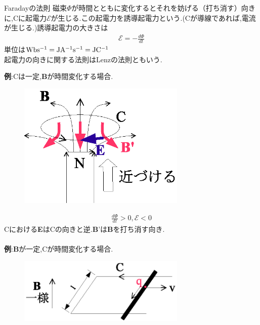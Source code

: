 \documentclass[../main]{subfiles}
\begin{document}
\begin{itembox}[c]{Faradayの法則}
磁束$\Phi$が時間とともに変化するとそれを妨げる（打ち消す）向きに,Cに起電力$\mathcal{E}$が生じる.この起電力を誘導起電力という.(Cが導線であれば,電流が生じる.)誘導起電力の大きさは
\begin{eqnarray}
\mathcal{E}=-\frac{d \Phi}{dt}
\end{eqnarray}
単位は${\rm Wbs^{-1}=JA^{-1}s^{-1}=JC^{-1}}$ \\
起電力の向きに関する法則はLenzの法則ともいう.
\end{itembox}
{\bf 例}:Cは一定,{\bf B}が時間変化する場合. \\

\begin{figure}[htbp]
 \begin{center}
  \includegraphics[width=80mm]{11.1.eps}
 \end{center}
 \caption{}
 \label{fig:one}
\end{figure}

\begin{eqnarray*}
\frac{d \Phi}{dt} > 0,\mathcal{E}<0
\end{eqnarray*}
Cにおける{\bf E}はCの向きと逆.{\bf B}'は{\bf B}を打ち消す向き. \\
\\
{\bf 例}:{\bf B}が一定,Cが時間変化する場合. \\

\begin{figure}[htbp]
 \begin{center}
  \includegraphics[width=80mm]{11.2.eps}
 \end{center}
 \caption{}
 \label{fig:one}
\end{figure}
\end{document}
